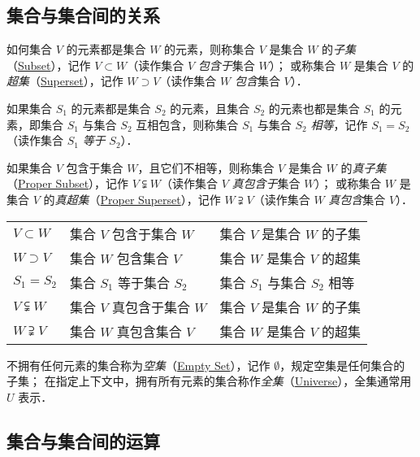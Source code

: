 \documentclass{ctexbook}
\begin{document}
\subsection{集合与集合间的关系}

如何集合 $V$ 的元素都是集合 $W$ 的元素，则称集合 $V$ 是集合 $W$ 的\emph{子集}（\href{http://mathworld.wolfram.com/Subset.html}{Subset}），记作 $V\subset{}W$（读作集合 $V$ \emph{包含于}集合 $W$）；
或称集合 $W$ 是集合 $V$ 的\emph{超集}（\href{http://mathworld.wolfram.com/Superset.html}{Superset}），记作 $W\supset{}V$（读作集合 $W$ \emph{包含}集合 $V$）．

如果集合 $S_1$ 的元素都是集合 $S_2$ 的元素，且集合 $S_2$ 的元素也都是集合 $S_1$ 的元素，即集合 $S_1$ 与集合 $S_2$ 互相包含，则称集合 $S_1$ 与集合 $S_2$ \emph{相等}，记作 $S_1=S_2$（读作集合 $S_1$ \emph{等于} $S_2$）．

如果集合 $V$ 包含于集合 $W$，且它们不相等，则称集合 $V$ 是集合 $W$ 的\emph{真子集}（\href{http://mathworld.wolfram.com/ProperSubset.html}{Proper Subset}），记作 $V\subsetneqq{}W$（读作集合 $V$ \emph{真包含于}集合 $W$）；
或称集合 $W$ 是集合 $V$ 的\emph{真超集}（\href{http://mathworld.wolfram.com/ProperSuperset.html}{Proper Superset}），记作 $W\supsetneqq{}V$（读作集合 $W$ \emph{真包含}集合 $V$）．

\begin{table}[h]
	\centering
	\begin{tabular}{l l l}
		\hline
		$V\subset{}W$     & 集合 $V$ 包含于集合 $W$   & 集合 $V$ 是集合 $W$ 的子集   \\
		$W\supset{}V$     & 集合 $W$ 包含集合 $V$     & 集合 $W$ 是集合 $V$ 的超集   \\
		$S_1=S_2$         & 集合 $S_1$ 等于集合 $S_2$ & 集合 $S_1$ 与集合 $S_2$ 相等 \\
		$V\subsetneqq{}W$ & 集合 $V$ 真包含于集合 $W$ & 集合 $V$ 是集合 $W$ 的子集   \\
		$W\supsetneqq{}V$ & 集合 $W$ 真包含集合 $V$   & 集合 $W$ 是集合 $V$ 的超集   \\
		\hline
	\end{tabular}
\end{table}

不拥有任何元素的集合称为\emph{空集}（\href{http://mathworld.wolfram.com/EmptySet.html}{Empty Set}），记作 $\emptyset$，规定空集是任何集合的子集；
在指定上下文中，拥有所有元素的集合称作\emph{全集}（\href{http://mathworld.wolfram.com/UniversalSet.html}{Universe}），全集通常用 $U$ 表示．

\subsection{集合与集合间的运算}
\end{document}
